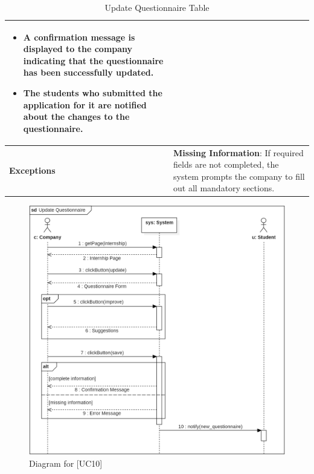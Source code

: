 \begin{table}[H]
\begin{tabular}{|p{4cm}|p{11cm}|}
    {\setlength{\leftmargini}{1.1em}
    \begin{itemize}
        \item A confirmation message is displayed to the company indicating that the questionnaire has been successfully updated.
        \item The students who submitted the application for it are notified about the changes to the questionnaire.
    \end{itemize}} \\ \hline
    \textbf{Exceptions} & 
    \textbf{Missing Information}: If required fields are not completed, the system prompts the company to fill out all mandatory sections. \\ \hline
    \end{tabular}
    \caption{Update Questionnaire Table}
\end{table}

\begin{figure} [H]
    \centering
    \includegraphics[width=1\linewidth]{Use Cases Images/update_questionnaire.png}
    \caption{Diagram for [UC10]}
    \label{fig: Update Questionnaire Diagram}
\end{figure}


